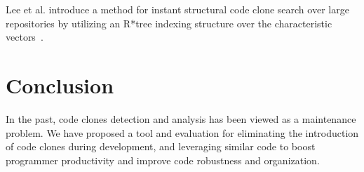 \documentclass[preprint,10pt]{sigplanconf}
\begin{document}
Lee et al. introduce a method for instant structural code clone search
over large repositories by utilizing an R*tree indexing structure over
the characteristic vectors~\cite{Lee2010}.

\section{Conclusion}

In the past, code clones detection and analysis has been viewed as a
maintenance problem. 
We have proposed a tool and evaluation for
eliminating the introduction of code clones during development, and
leveraging similar code to boost programmer productivity and improve
code robustness and organization.

%

%
%
\end{document}

